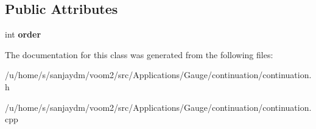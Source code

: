 \subsection*{Public Attributes}
\begin{DoxyCompactItemize}
\item 
\hypertarget{class_quadrature_abacbaa8ba9bff509702e0850c36b99bb}{
int {\bfseries order}}
\label{class_quadrature_abacbaa8ba9bff509702e0850c36b99bb}

\end{DoxyCompactItemize}


The documentation for this class was generated from the following files:\begin{DoxyCompactItemize}
\item 
/u/home/s/sanjaydm/voom2/src/Applications/Gauge/continuation/continuation.h\item 
/u/home/s/sanjaydm/voom2/src/Applications/Gauge/continuation/continuation.cpp\end{DoxyCompactItemize}
